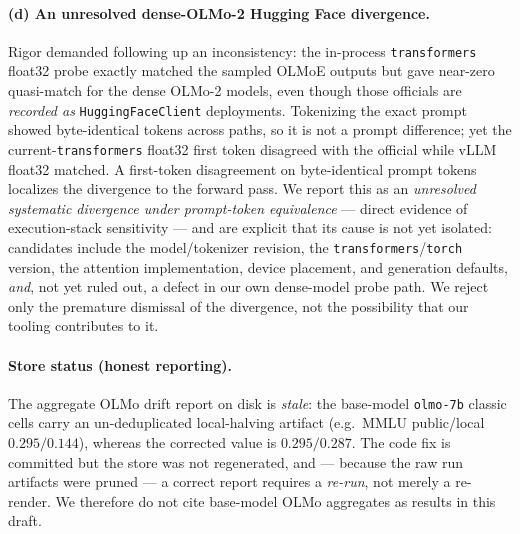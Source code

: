 \paragraph{(d) An unresolved dense-OLMo-2 Hugging Face divergence.} Rigor demanded
following up an inconsistency: the in-process \texttt{transformers} float32 probe
exactly matched the sampled OLMoE outputs but gave near-zero quasi-match for the
dense OLMo-2 models, even though those officials are \emph{recorded as}
\texttt{HuggingFaceClient} deployments. Tokenizing the exact prompt showed
byte-identical tokens across paths, so it is not a prompt difference; yet the
current-\texttt{transformers} float32 first token disagreed with the official while
vLLM float32 matched. A first-token disagreement on byte-identical prompt tokens
localizes the divergence to the forward pass. We report this as an
\emph{unresolved systematic divergence under prompt-token equivalence} --- direct
evidence of execution-stack sensitivity --- and are explicit that its cause is not
yet isolated: candidates include the model/tokenizer revision, the
\texttt{transformers}/\texttt{torch} version, the attention implementation, device
placement, and generation defaults, \emph{and}, not yet ruled out, a defect in our
own dense-model probe path. We reject only the premature dismissal of the
divergence, not the possibility that our tooling contributes to it.

\paragraph{Store status (honest reporting).} The aggregate OLMo drift report on
disk is \emph{stale}: the base-model \texttt{olmo-7b} classic cells carry an
un-deduplicated local-halving artifact (e.g.\ MMLU public/local $0.295/0.144$),
whereas the corrected value is $0.295/0.287$. The code fix is committed but the
store was not regenerated, and --- because the raw run artifacts were pruned --- a
correct report requires a \emph{re-run}, not merely a re-render. We therefore do
not cite base-model OLMo aggregates as results in this draft.
\par\smallskip\noindent{}\par\smallskip

